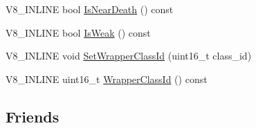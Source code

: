 \begin{DoxyCompactItemize}
\item 
V8\-\_\-\-I\-N\-L\-I\-N\-E bool \hyperlink{classv8_1_1PersistentBase_a4a64c26d91ed6a276aa8a7ca4bb7683a}{Is\-Near\-Death} () const 
\item 
V8\-\_\-\-I\-N\-L\-I\-N\-E bool \hyperlink{classv8_1_1PersistentBase_a714b7794149df483837a2c6b09d52396}{Is\-Weak} () const 
\item 
V8\-\_\-\-I\-N\-L\-I\-N\-E void \hyperlink{classv8_1_1PersistentBase_ac4c979164b3ed4dc92319e6f5a108d3d}{Set\-Wrapper\-Class\-Id} (uint16\-\_\-t class\-\_\-id)
\item 
V8\-\_\-\-I\-N\-L\-I\-N\-E uint16\-\_\-t \hyperlink{classv8_1_1PersistentBase_a01a46bf4e69ed9a837639702ee234643}{Wrapper\-Class\-Id} () const 
\end{DoxyCompactItemize}
\subsection*{Friends}
